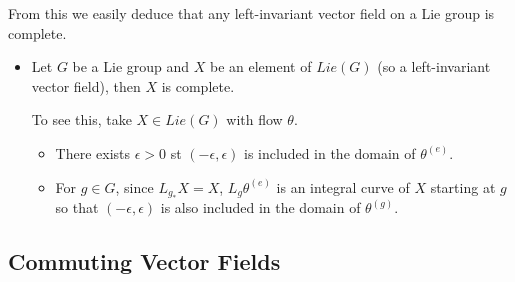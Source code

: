 \documentclass{report}
\theoremstyle{definition}
\begin{document}
From this we easily deduce that any left-invariant vector field on a Lie group is complete.
\begin{itemize}
    \item \label{LeftInvariantComplete} Let $G$ be a Lie group and $X$ be an element of $Lie(G)$ (so a left-invariant vector field), then $X$ is complete.

    To see this, take $X\in Lie(G)$ with flow $\theta$.
    \begin{itemize}
        \item There exists $\epsilon>0$ st $(-\epsilon,\epsilon)$ is included in the domain of $\theta^{(e)}$.
        \item For $g\in G$, since $L_g_*X=X$, $L_g\theta^{(e)}$ is an integral curve of $X$ starting at $g$ so that $(-\epsilon,\epsilon)$ is also included in the domain of $\theta^{(g)}$.
    \end{itemize}
\end{itemize}

\subsection{Commuting Vector Fields}
\end{document}
